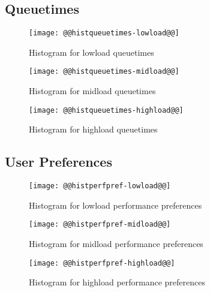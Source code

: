 \documentclass[11pt]{article}
\begin{document}
\newpage
\subsection{Queuetimes}
\begin{figure}[htbp]
  \begin{center}
    \texttt{[image: @@histqueuetimes-lowload@@]}
    \caption{Histogram for lowload queuetimes}
    \label{fig:histqueuetimes-lowload}
  \end{center}
\end{figure}
\begin{figure}[htbp]
  \begin{center}
    \texttt{[image: @@histqueuetimes-midload@@]}
    \caption{Histogram for midload queuetimes}
    \label{fig:histqueuetimes-midload}
  \end{center}
\end{figure}
\begin{figure}[htbp]
  \begin{center}
    \texttt{[image: @@histqueuetimes-highload@@]}
    \caption{Histogram for highload queuetimes}
    \label{fig:histqueuetimes-highload}
  \end{center}
\end{figure}

\newpage
\subsection{User Preferences}
\begin{figure}[htbp]
  \begin{center}
    \texttt{[image: @@histperfpref-lowload@@]}
    \caption{Histogram for lowload performance preferences}
    \label{fig:histperfpref-lowload}
  \end{center}
\end{figure}
\begin{figure}[htbp]
  \begin{center}
    \texttt{[image: @@histperfpref-midload@@]}
    \caption{Histogram for midload performance preferences}
    \label{fig:histperfpref-midload}
  \end{center}
\end{figure}
\begin{figure}[htbp]
  \begin{center}
    \texttt{[image: @@histperfpref-highload@@]}
    \caption{Histogram for highload performance preferences}
    \label{fig:histperfpref-highload}
  \end{center}
\end{figure}
\end{document}
